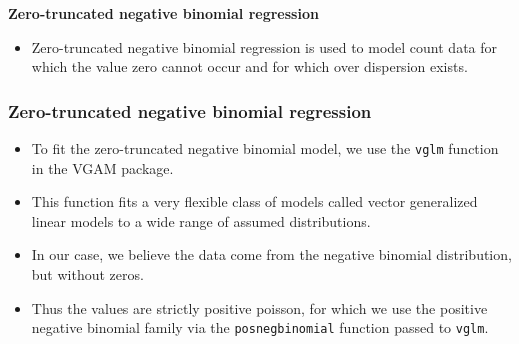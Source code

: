 \documentclass[MASTER.tex]{subfiles}
\begin{document}
	

	\begin{frame}[fragile]
			\Large
	\textbf{Zero-truncated negative binomial regression}

		\begin{itemize}
\item	Zero-truncated negative binomial regression is used to model count data for which the value zero cannot occur and for which over dispersion exists.
		\end{itemize}


%
\end{frame}
%
\begin{frame}
\frametitle{Zero-truncated negative binomial regression}
\begin{itemize}
\item 
	To fit the zero-truncated negative binomial model, we use the \texttt{vglm} function in the VGAM package. 
\item This function fits a very flexible class of models called vector generalized linear models to a wide range of assumed distributions. 
\item In our case, we believe the data come from the negative binomial distribution, but without zeros. 
\item Thus the values are strictly positive poisson, for which we use the positive negative binomial family via the \texttt{posnegbinomial} function passed to \texttt{vglm}.
\end{itemize}
\end{frame}
\end{document}
